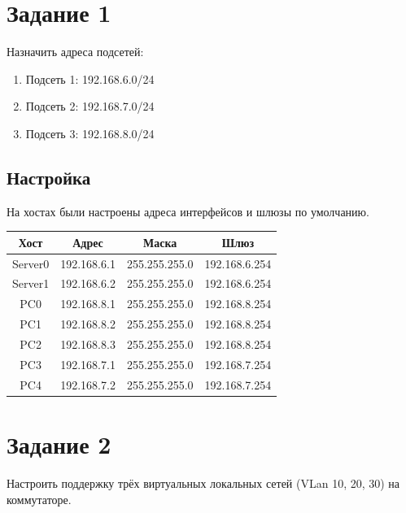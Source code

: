 \documentclass[a4paper,oneside,12pt]{extreport}
\begin{document}


\tableofcontents

\chapter{Задание 1}

Назначить адреса подсетей:
\begin{enumerate}
	\item Подсеть 1: 192.168.6.0/24
	\item Подсеть 2: 192.168.7.0/24
	\item Подсеть 3: 192.168.8.0/24
\end{enumerate}

\section{Настройка}

На хостах были настроены адреса интерфейсов и шлюзы по умолчанию.

\begin{table}[H]
	\centering
	\begin{tabular}{|c|c|c|c|}
		\hline
		\textbf{Хост} & \textbf{Адрес} & \textbf{Маска} & \textbf{Шлюз} \\ \hline
		Server0       & 192.168.6.1    & 255.255.255.0  & 192.168.6.254 \\ \hline
		Server1       & 192.168.6.2    & 255.255.255.0  & 192.168.6.254 \\ \hline
		PC0           & 192.168.8.1    & 255.255.255.0  & 192.168.8.254 \\ \hline
		PC1           & 192.168.8.2    & 255.255.255.0  & 192.168.8.254 \\ \hline
		PC2           & 192.168.8.3    & 255.255.255.0  & 192.168.8.254 \\ \hline
		PC3           & 192.168.7.1    & 255.255.255.0  & 192.168.7.254 \\ \hline
		PC4           & 192.168.7.2    & 255.255.255.0  & 192.168.7.254 \\ \hline
	\end{tabular}
\end{table}

\chapter{Задание 2}

Настроить поддержку трёх виртуальных локальных сетей (VLan 10, 20, 30) на коммутаторе.
\end{document}
